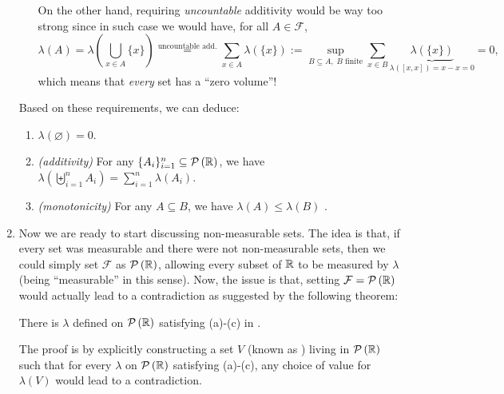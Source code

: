 \begin{enumerate}
\begin{enumerate}[label={(\arabic*)}]
\begin{note}
On the other hand, requiring \emph{uncountable} additivity would be way too
strong since in such case we would have, for all \(A\in\mathcal{F}\),
\[
\lambda(A)=\lambda\left(\bigcup_{x\in A}\{x\}\right)
\overset{\text{uncountable add.}}{=}
\sum_{x\in A}^{}\lambda(\{x\})
:=\sup_{B\subseteq A,\; B\text{ finite}}\sum_{x\in B}^{}\underbrace{\lambda(\{x\})}_{\lambda([x,x])=x-x=0}
=0,
\]
which means that \emph{every} set has a ``zero volume''!
\end{note}
\end{enumerate}
Based on these requirements, we can deduce:
\begin{enumerate}
\item \(\lambda(\varnothing)=0\).
\item \emph{(additivity)} For any \(\{A_i\}_{i=1}^{n}\subseteq\mathcal{P}\left(\mathbb{R}\right)\), we have
\(\lambda(\biguplus_{i=1}^{n}A_i)=\sum_{i=1}^{n}\lambda(A_i)\).
\item \emph{(monotonicity)} For any \(A\subseteq B\), we have
\(\lambda(A)\le\lambda(B)\) .
\end{enumerate}
\begin{pf}
\begin{enumerate}
\item \(\lambda(\varnothing)=\lambda((a,a])=a-a=0\).
\item \(\lambda(\biguplus_{i=1}^{n}A_i)=\lambda(\biguplus_{i=1}^{n}A_i\uplus\varnothing\uplus\varnothing\uplus\dotsb)
\overset{\text{\(\sigma\)-add.}}{=}\sum_{i=1}^{n}\lambda(A_i)+\sum_{i=n+1}^{\infty}0=\sum_{i=1}^{n}\lambda(A_i)\).
\item \(\lambda(B)=\lambda(B\uplus(B\setminus A))=\lambda(A)
+\underbrace{\lambda(B\setminus A)}_{\ge 0}\ge \lambda(A)\).
\end{enumerate}
\end{pf}
\item Now we are ready to start discussing non-measurable sets. The idea is
that, if every set was measurable and there were not non-measurable sets, then
we could simply set \(\mathcal{F}\) as \(\mathcal{P}\left(\mathbb{R}\right)\), allowing every subset of
\(\mathbb{R}\) to be measured by \(\lambda\) (being ``measurable'' in this sense). Now,
the issue is that, setting \(\mathcal{F}=\mathcal{P}\left(\mathbb{R}\right)\) would actually lead to a
contradiction \warn{} as suggested by the following theorem:

\begin{theorem}
\label{thm:vitali}
There is  \(\lambda\) defined on \(\mathcal{P}\left(\mathbb{R}\right)\) satisfying (a)-(c) in
.
\end{theorem}
\begin{pf}
The proof is by explicitly constructing a set \(V\) (known as ) living in \(\mathcal{P}\left(\mathbb{R}\right)\) such that for every \(\lambda\) on \(\mathcal{P}\left(\mathbb{R}\right)\)
satisfying (a)-(c), any choice of value for \(\lambda(V)\) would lead to a
contradiction.


\end{pf}
\end{enumerate}
